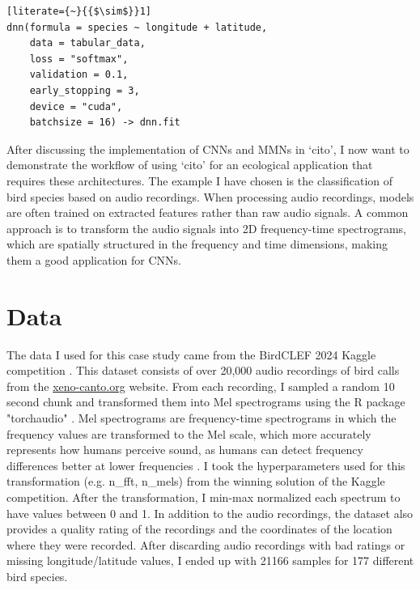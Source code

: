 \documentclass[12pt,twoside]{scrreport}
\newcommand{\pkg}[1]{`#1'}
\begin{document}
\newsavebox{\dnn} %
\begin{lrbox}{\dnn}
	\begin{minipage}{\wd\cnn}
		\begin{lstlisting}[literate={~}{{$\sim$}}1]
dnn(formula = species ~ longitude + latitude,                             
    data = tabular_data,
    loss = "softmax",
    validation = 0.1,
    early_stopping = 3,
    device = "cuda",
    batchsize = 16) -> dnn.fit
		\end{lstlisting}
	\end{minipage}
\end{lrbox}

\noindent After discussing the implementation of CNNs and MMNs in \pkg{cito}, I now want to demonstrate the workflow of using \pkg{cito} for an ecological application that requires these architectures. The example I have chosen is the classification of bird species based on audio recordings. When processing audio recordings, models are often trained on extracted features rather than raw audio signals. A common approach is to transform the audio signals into 2D frequency-time spectrograms, which are spatially structured in the frequency and time dimensions, making them a good application for CNNs.

\section*{Data}
The data I used for this case study came from the BirdCLEF 2024 Kaggle competition \citep{birdclef-2024}. This dataset consists of over 20,000 audio recordings of bird calls from the \url{xeno-canto.org} website. From each recording, I sampled a random 10 second chunk and transformed them into Mel spectrograms using the R package "torchaudio" \citep{keydanaTorchaudioInterfacePytorchs2023}. Mel spectrograms are frequency-time spectrograms in which the frequency values are transformed to the Mel scale, which more accurately represents how humans perceive sound, as humans can detect frequency differences better at lower frequencies \citep{stevensScaleMeasurementPsychological1937}. I took the hyperparameters used for this transformation (e.g. n\_fft, n\_mels) from the winning solution of the Kaggle competition. After the transformation, I min-max normalized each spectrum to have values between 0 and 1. In addition to the audio recordings, the dataset also provides a quality rating of the recordings and the coordinates of the location where they were recorded. After discarding audio recordings with bad ratings or missing longitude/latitude values, I ended up with 21166 samples for 177 different bird species.
\end{document}

